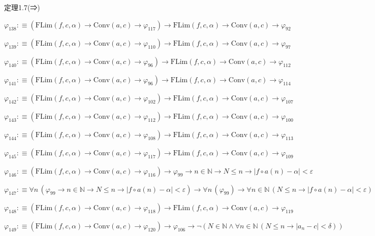 \begin{fullproof}{定理1.7(⇒)}
\begin{abbrevlist}
\item $\varphi_{138} :\equiv (\mathrm{FLim}(f,c,\alpha) \to \mathrm{Conv}(a,c) \to \varphi_{117}) \to \mathrm{FLim}(f,c,\alpha) \to \mathrm{Conv}(a,c) \to \varphi_{92}$
\item $\varphi_{139} :\equiv (\mathrm{FLim}(f,c,\alpha) \to \mathrm{Conv}(a,c) \to \varphi_{110}) \to \mathrm{FLim}(f,c,\alpha) \to \mathrm{Conv}(a,c) \to \varphi_{97}$
\item $\varphi_{140} :\equiv (\mathrm{FLim}(f,c,\alpha) \to \mathrm{Conv}(a,c) \to \varphi_{96}) \to \mathrm{FLim}(f,c,\alpha) \to \mathrm{Conv}(a,c) \to \varphi_{112}$
\item $\varphi_{141} :\equiv (\mathrm{FLim}(f,c,\alpha) \to \mathrm{Conv}(a,c) \to \varphi_{96}) \to \mathrm{FLim}(f,c,\alpha) \to \mathrm{Conv}(a,c) \to \varphi_{114}$
\item $\varphi_{142} :\equiv (\mathrm{FLim}(f,c,\alpha) \to \mathrm{Conv}(a,c) \to \varphi_{102}) \to \mathrm{FLim}(f,c,\alpha) \to \mathrm{Conv}(a,c) \to \varphi_{107}$
\item $\varphi_{143} :\equiv (\mathrm{FLim}(f,c,\alpha) \to \mathrm{Conv}(a,c) \to \varphi_{112}) \to \mathrm{FLim}(f,c,\alpha) \to \mathrm{Conv}(a,c) \to \varphi_{100}$
\item $\varphi_{144} :\equiv (\mathrm{FLim}(f,c,\alpha) \to \mathrm{Conv}(a,c) \to \varphi_{108}) \to \mathrm{FLim}(f,c,\alpha) \to \mathrm{Conv}(a,c) \to \varphi_{113}$
\item $\varphi_{145} :\equiv (\mathrm{FLim}(f,c,\alpha) \to \mathrm{Conv}(a,c) \to \varphi_{117}) \to \mathrm{FLim}(f,c,\alpha) \to \mathrm{Conv}(a,c) \to \varphi_{109}$
\item $\varphi_{146} :\equiv (\mathrm{FLim}(f,c,\alpha) \to \mathrm{Conv}(a,c) \to \varphi_{116}) \to \varphi_{99} \to n \in \mathbb{N} \to N \leq n \to \lvert f \circ a(n) - \alpha \rvert < \varepsilon$
\item $\varphi_{147} :\equiv \forall n\,(\varphi_{99} \to n \in \mathbb{N} \to N \leq n \to \lvert f \circ a(n) - \alpha \rvert < \varepsilon) \to \forall n\,(\varphi_{99}) \to \forall n \in \mathbb{N}\,(N \leq n \to \lvert f \circ a(n) - \alpha \rvert < \varepsilon)$
\item $\varphi_{148} :\equiv (\mathrm{FLim}(f,c,\alpha) \to \mathrm{Conv}(a,c) \to \varphi_{118}) \to \mathrm{FLim}(f,c,\alpha) \to \mathrm{Conv}(a,c) \to \varphi_{119}$
\item $\varphi_{149} :\equiv (\mathrm{FLim}(f,c,\alpha) \to \mathrm{Conv}(a,c) \to \varphi_{120}) \to \varphi_{106} \to \neg (N \in \mathbb{N} \land \forall n \in \mathbb{N}\,(N \leq n \to \lvert a_{n} - c \rvert < \delta))$

\end{abbrevlist}
\end{fullproof}
